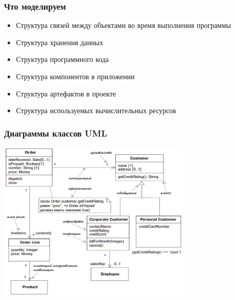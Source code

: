 \documentclass[xetex,mathserif,serif]{beamer}
\begin{document}
	\begin{frame}
		\frametitle{Что моделируем}
		\begin{itemize}
			\item Структура связей между объектами во время выполнения программы
			\item Структура хранения данных
			\item Структура программного кода
			\item Структура компонентов в приложении
			\item Структура артефактов в проекте
			\item Структура используемых вычислительных ресурсов
		\end{itemize}
	\end{frame}

	\begin{frame}
		\frametitle{Диаграммы классов UML}
		\begin{center}
			\includegraphics[width=0.7\textwidth]{umlClassDiagram.png}
		\end{center}
	\end{frame}
\end{document}
